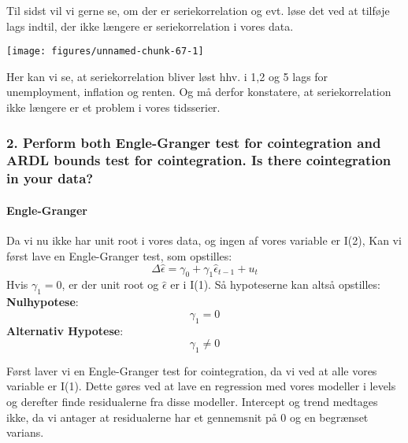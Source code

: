 \documentclass[
  10pt,
]{article}
\begin{document}
Til sidst vil vi gerne se, om der er seriekorrelation og evt. løse det
ved at tilføje lags indtil, der ikke længere er seriekorrelation i vores
data.

\begin{center}\texttt{[image: figures/unnamed-chunk-67-1]} \end{center}

Her kan vi se, at seriekorrelation bliver løst hhv. i 1,2 og 5 lags for
unemployment, inflation og renten. Og må derfor konstatere, at
seriekorrelation ikke længere er et problem i vores tidsserier.

\newpage

\hypertarget{perform-both-engle-granger-test-for-cointegration-and-ardl-bounds-test-for-cointegration.-is-there-cointegration-in-your-data}{%
\subsubsection{2. Perform both Engle-Granger test for cointegration and
ARDL bounds test for cointegration. Is there cointegration in your
data?}\label{perform-both-engle-granger-test-for-cointegration-and-ardl-bounds-test-for-cointegration.-is-there-cointegration-in-your-data}}

\hypertarget{engle-granger}{%
\paragraph{Engle-Granger}\label{engle-granger}}

\leavevmode

Da vi nu ikke har unit root i vores data, og ingen af vores variable er
I(2), Kan vi først lave en Engle-Granger test, som opstilles:
\[\Delta\hat{\epsilon}=\gamma_0 + \gamma_1\hat{\epsilon}_{t-1}+u_t   \]
Hvis \(\gamma_1 =0\), er der unit root og \(\hat{\epsilon}\) er i I(1).
Så hypoteserne kan altså opstilles:\\
\textbf{Nulhypotese}:
\[\gamma_1 = 0  \tag{Unit root(No cointegration)}  \]
\textbf{Alternativ Hypotese}:
\[\gamma_1 \neq 0 \tag{No unit root(Cointegration)}\]

Først laver vi en Engle-Granger test for cointegration, da vi ved at
alle vores variable er I(1). Dette gøres ved at lave en regression med
vores modeller i levels og derefter finde residualerne fra disse
modeller. Intercept og trend medtages ikke, da vi antager at
residualerne har et gennemsnit på 0 og en begrænset varians.\\
~\\
\end{document}
